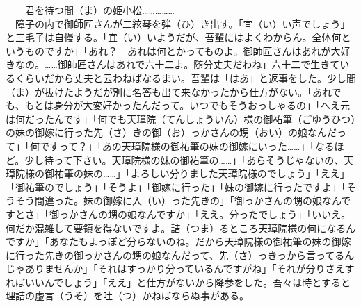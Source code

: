 　　君を待つ間（ま）の姫小松\ldots{}\ldots{}\ldots{}\ldots{}\ldots{}\\
　障子の内で御師匠さんが二絃琴を弾（ひ）き出す。「宜（い）い声でしょう」と三毛子は自慢する。「宜（い）いようだが、吾輩にはよくわからん。全体何というものですか」「あれ？　あれは何とかってものよ。御師匠さんはあれが大好きなの。\ldots{}\ldots{}御師匠さんはあれで六十二よ。随分丈夫だわね」六十二で生きているくらいだから丈夫と云わねばなるまい。吾輩は「はあ」と返事をした。少し間（ま）が抜けたようだが別に名答も出て来なかったから仕方がない。「あれでも、もとは身分が大変好かったんだって。いつでもそうおっしゃるの」「へえ元は何だったんです」「何でも天璋院（てんしょういん）様の御祐筆（ごゆうひつ）の妹の御嫁に行った先（さ）きの御（お）っかさんの甥（おい）の娘なんだって」「何ですって？」「あの天璋院様の御祐筆の妹の御嫁にいった\ldots{}\ldots{}」「なるほど。少し待って下さい。天璋院様の妹の御祐筆の\ldots{}\ldots{}」「あらそうじゃないの、天璋院様の御祐筆の妹の\ldots{}\ldots{}」「よろしい分りました天璋院様のでしょう」「ええ」「御祐筆のでしょう」「そうよ」「御嫁に行った」「妹の御嫁に行ったですよ」「そうそう間違った。妹の御嫁に入（い）った先きの」「御っかさんの甥の娘なんですとさ」「御っかさんの甥の娘なんですか」「ええ。分ったでしょう」「いいえ。何だか混雑して要領を得ないですよ。詰（つま）るところ天璋院様の何になるんですか」「あなたもよっぽど分らないのね。だから天璋院様の御祐筆の妹の御嫁に行った先きの御っかさんの甥の娘なんだって、先（さ）っきっから言ってるんじゃありませんか」「それはすっかり分っているんですがね」「それが分りさえすればいいんでしょう」「ええ」と仕方がないから降参をした。吾々は時とすると理詰の虚言（うそ）を吐（つ）かねばならぬ事がある。\\
